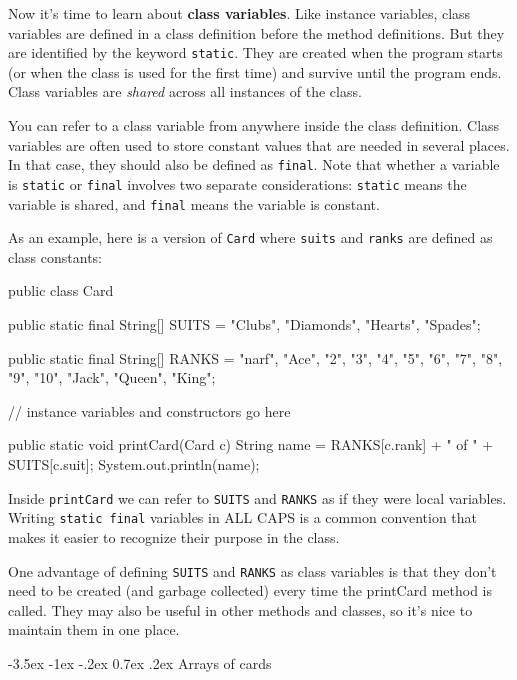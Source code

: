 \documentclass[12pt]{book}
\makeatletter
\renewcommand{\section}{\@startsection {section}{1}{\z@}%
    {-3.5ex \@plus -1ex \@minus -.2ex}%
    {0.7ex \@plus.2ex}%
    {\normalfont\Large\bfseries}}
\theoremstyle{exercise}
\newcommand{\java}[1]{\lstinline{#1}} %
\makeatother
\begin{document}

Now it's time to learn about {\bf class variables}.
Like instance variables, class variables are defined in a class definition before the method definitions.
But they are identified by the keyword \java{static}.
They are created when the program starts (or when the class is used for the first time) and survive until the program ends.
Class variables are {\em shared} across all instances of the class.

You can refer to a class variable from anywhere inside the class definition.
Class variables are often used to store constant values that are needed in several places.
In that case, they should also be defined as \java{final}.
Note that whether a variable is \java{static} or \java{final} involves two separate considerations:
\java{static} means the variable is shared, and \java{final} means the variable is constant.

As an example, here is a version of \java{Card} where \java{suits} and \java{ranks} are defined as class constants:

\begin{code}
public class Card {

    public static final String[] SUITS = {
        "Clubs", "Diamonds", "Hearts", "Spades"};

    public static final String[] RANKS = {
        "narf", "Ace", "2", "3", "4", "5", "6", "7", "8", "9",
        "10", "Jack", "Queen", "King"};

    // instance variables and constructors go here

    public static void printCard(Card c) {
        String name = RANKS[c.rank] + " of " + SUITS[c.suit];
        System.out.println(name);
    }
}
\end{code}

Inside \java{printCard} we can refer to \java{SUITS} and \java{RANKS} as if they were local variables.
Writing \java{static final} variables in ALL CAPS is a common convention that makes it easier to recognize their purpose in the class.

One advantage of defining \java{SUITS} and \java{RANKS} as class variables is that they don't need to be created (and garbage collected) every time the printCard method is called.
They may also be useful in other methods and classes, so it's nice to maintain them in one place.


\section{Arrays of cards}
\label{cardarray}
\end{document}
